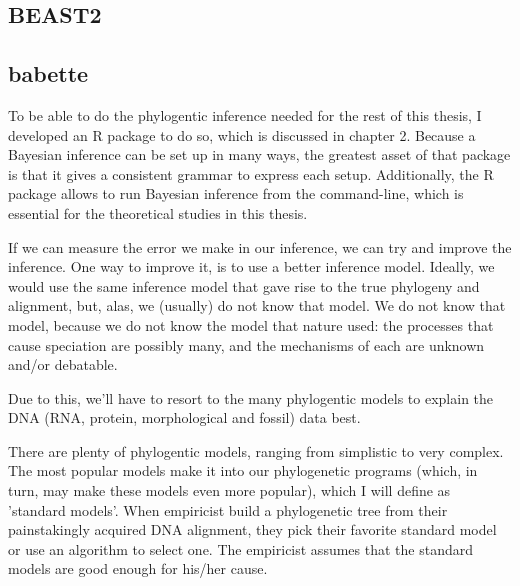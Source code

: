 {%
\subsection{BEAST2}

\subsection{babette}

To be able to do the phylogentic inference needed for the rest of this
thesis, I developed an R package to do so, which
is discussed in chapter 2. Because a Bayesian inference can be set up in
many ways, the greatest asset of that package is that it gives a
consistent grammar to express each setup. Additionally, the R package allows
to run Bayesian inference from the command-line, which is essential for
the theoretical studies in this thesis.

If we can measure the error we make in our inference, 
we can try and improve the inference. 
One way to improve it, is to use a better inference model.
Ideally, we would use the same inference model that gave rise to
the true phylogeny and alignment, but, alas, 
we (usually) do not know that model.
We do not know that model, because we do not know the
model that nature used: the
processes that cause speciation are possibly many, and 
the mechanisms of each are unknown and/or debatable.


Due to this, we'll have to resort to the many phylogentic models 
to explain the DNA (RNA, protein, morphological and fossil) data best.

There are plenty of phylogentic models, ranging from simplistic to
very complex. The most popular models make it into our
phylogenetic programs (which, in turn, may make these models even
more popular), which I will define as 'standard models'.
When empiricist build a phylogenetic tree from their
painstakingly acquired DNA alignment, they pick their favorite standard
model or use an algorithm to select one. The empiricist assumes that the
standard models are good enough for his/her cause.

}

